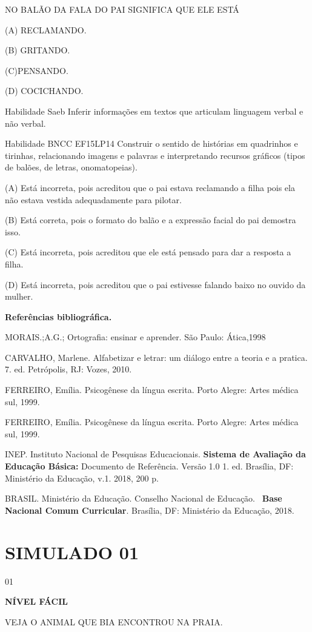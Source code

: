 {{NO BALÃO DA FALA DO PAI SIGNIFICA QUE ELE ESTÁ

(A) RECLAMANDO.

(B) GRITANDO.

(C)PENSANDO.

(D) COCICHANDO.

Habilidade Saeb Inferir informações em textos que articulam linguagem
verbal e não verbal.

Habilidade BNCC EF15LP14 Construir o sentido de histórias em quadrinhos
e tirinhas, relacionando imagens e palavras e interpretando recursos
gráficos (tipos de balões, de letras, onomatopeias).

(A) Está incorreta, pois acreditou que o pai estava reclamando a filha
pois ela não estava vestida adequadamente para pilotar.

(B) Está correta, pois o formato do balão e a expressão facial do pai
demostra isso.

(C) Está incorreta, pois acreditou que ele está pensado para dar a
resposta a filha.

(D) Está incorreta, pois acreditou que o pai estivesse falando baixo no
ouvido da mulher.

\textbf{Referências bibliográfica.}

MORAIS.;A.G.; Ortografia: ensinar e aprender. São Paulo: Ática,1998

CARVALHO, Marlene. Alfabetizar e letrar: um diálogo entre a teoria e a
pratica. 7. ed. Petrópolis, RJ: Vozes, 2010.

FERREIRO, Emília. Psicogênese da língua escrita. Porto Alegre: Artes
médica sul, 1999.

FERREIRO, Emília. Psicogênese da língua escrita. Porto Alegre: Artes
médica sul, 1999.

INEP. Instituto Nacional de Pesquisas Educacionais. \textbf{Sistema de
Avaliação da Educação Básica:} Documento de Referência. Versão 1.0 1.
ed. Brasília, DF: Ministério da Educação, v.1. 2018, 200 p.

BRASIL. Ministério da Educação. Conselho Nacional de Educação.~
\textbf{Base Nacional Comum Curricular}. Brasília, DF: Ministério da
Educação, 2018.

\section{SIMULADO 01}

\num{01}

\textbf{NÍVEL FÁCIL}

VEJA O ANIMAL QUE BIA ENCONTROU NA PRAIA.

}}
